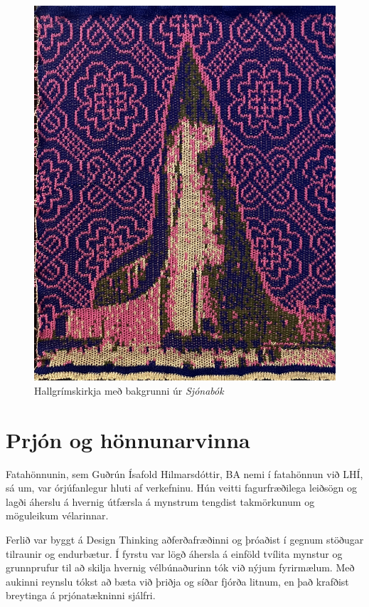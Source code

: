 \documentclass[a4paper,10pt,twocolumn]{article}
\begin{document}
\begin{figure}
    \centering
    \includegraphics[width=\linewidth]{figs/hallgrimskirkja.JPG}
    \caption{Hallgrímskirkja með bakgrunni úr \emph{Sjónabók}}
    \label{fig:hallgrimskirkja}
\end{figure}


\section{Prjón og hönnunarvinna}
Fatahönnunin, sem Guðrún Ísafold Hilmarsdóttir, BA nemi í fatahönnun við LHÍ, sá um, var órjúfanlegur hluti af verkefninu. Hún veitti fagurfræðilega leiðsögn og lagði áherslu á hvernig útfærsla á mynstrum tengdist takmörkunum og möguleikum vélarinnar.

Ferlið var byggt á Design Thinking \cite{designthinking} aðferðafræðinni og þróaðist í gegnum stöðugar tilraunir og endurbætur. Í fyrstu var lögð áhersla á einföld tvílita mynstur og grunnprufur til að skilja hvernig vélbúnaðurinn tók við nýjum fyrirmælum. Með aukinni reynslu tókst að bæta við þriðja og síðar fjórða litnum, en það krafðist breytinga á prjónatækninni sjálfri.
\end{document}
